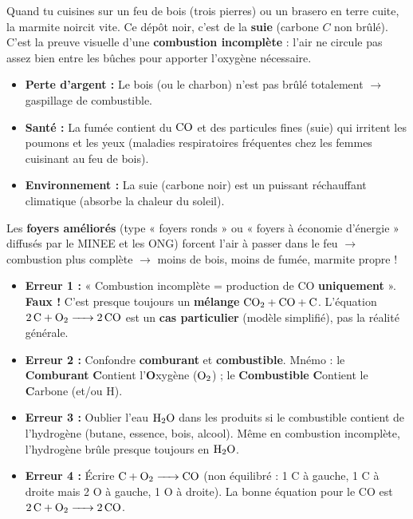 \documentclass[11pt]{article}
\begin{document}
\begin{savaistu}
Quand tu cuisines sur un feu de bois (trois pierres) ou un brasero en terre cuite, la marmite noircit vite. Ce dépôt noir, c'est de la \textbf{suie} (carbone $C$ non brûlé). C'est la preuve visuelle d'une \textbf{combustion incomplète} : l'air ne circule pas assez bien entre les bûches pour apporter l'oxygène nécessaire.
\begin{itemize}
\item \textbf{Perte d'argent :} Le bois (ou le charbon) n'est pas brûlé totalement $\rightarrow$ gaspillage de combustible.
\item \textbf{Santé :} La fumée contient du $\ce{CO}$ et des particules fines (suie) qui irritent les poumons et les yeux (maladies respiratoires fréquentes chez les femmes cuisinant au feu de bois).
\item \textbf{Environnement :} La suie (carbone noir) est un puissant réchauffant climatique (absorbe la chaleur du soleil).
\end{itemize}
Les \textbf{foyers améliorés} (type « foyers ronds » ou « foyers à économie d'énergie » diffusés par le MINEE et les ONG) forcent l'air à passer dans le feu $\rightarrow$ combustion plus complète $\rightarrow$ moins de bois, moins de fumée, marmite propre !
\end{savaistu}

\begin{attention}
\begin{itemize}
\item \textbf{Erreur 1 :} « Combustion incomplète = production de CO \textbf{uniquement} ». \textbf{Faux !} C'est presque toujours un \textbf{mélange} $\ce{CO2} + \ce{CO} + \ce{C}$. L'équation $\ce{2C + O2 -> 2CO}$ est un \textbf{cas particulier} (modèle simplifié), pas la réalité générale.
\item \textbf{Erreur 2 :} Confondre \textbf{comburant} et \textbf{combustible}. Mnémo : le \textbf{Comburant} \textbf{C}ontient l'\textbf{O}xygène ($\ce{O2}$) ; le \textbf{Combustible} \textbf{C}ontient le \textbf{C}arbone (et/ou H).
\item \textbf{Erreur 3 :} Oublier l'eau $\ce{H2O}$ dans les produits si le combustible contient de l'hydrogène (butane, essence, bois, alcool). Même en combustion incomplète, l'hydrogène brûle presque toujours en $\ce{H2O}$.
\item \textbf{Erreur 4 :} Écrire $\ce{C + O2 -> CO}$ (non équilibré : 1 C à gauche, 1 C à droite mais 2 O à gauche, 1 O à droite). La bonne équation pour le CO est $\ce{2C + O2 -> 2CO}$.
\end{itemize}
\end{attention}
\end{document}
